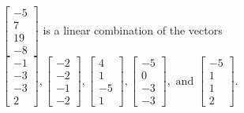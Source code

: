 \begin{exercise}
\begin{exerciseStatement}
  \end{exerciseStatement}
  \begin{exerciseAnswer}
   \(\left[\begin{array}{c}
-5 \\
7 \\
19 \\
-8
\end{array}\right]\) 
  	 is  
	a linear combination of the vectors \(\left[\begin{array}{c}
-1 \\
-3 \\
-3 \\
2
\end{array}\right] , \left[\begin{array}{c}
-2 \\
-2 \\
-1 \\
-2
\end{array}\right] , \left[\begin{array}{c}
4 \\
1 \\
-5 \\
1
\end{array}\right] , \left[\begin{array}{c}
-5 \\
0 \\
-3 \\
-3
\end{array}\right] , \text{ and } \left[\begin{array}{c}
-5 \\
1 \\
1 \\
2
\end{array}\right]\).

	
  


  \end{exerciseAnswer}
\end{exercise}